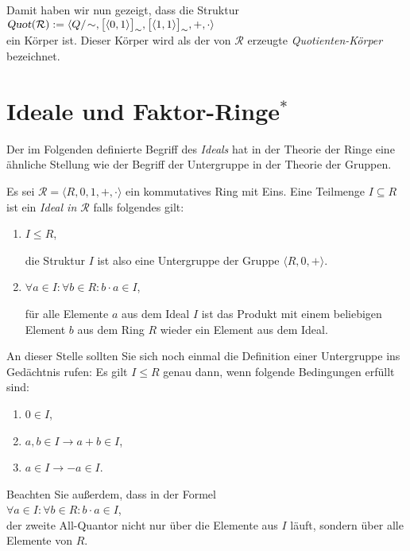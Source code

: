 Damit haben wir nun gezeigt, dass die Struktur
\\[0.2cm]
\hspace*{1.3cm}
$\textsl{Quot}(\mathcal{R}) := \langle Q/\!\sim, \bpr(0,1), \bpr(1,1), +, \cdot \rangle$ 
\\[0.2cm]
ein Körper ist.  Dieser Körper wird als der von $\mathcal{R}$ erzeugte \emph{Quotienten-Körper} bezeichnet.


\section{Ideale und Faktor-Ringe$^*$}
Der im Folgenden definierte Begriff des \emph{Ideals} hat in der Theorie der Ringe eine ähnliche
Stellung wie der Begriff der Untergruppe in der Theorie der Gruppen.
\begin{Definition}[Ideal]
Es sei $\mathcal{R} = \langle R, 0, 1, +, \cdot \rangle$ ein kommutatives Ring mit Eins.
Eine Teilmenge $I \subseteq R$ ist ein \emph{Ideal in $\mathcal{R}$} falls folgendes gilt:
\begin{enumerate}
\item $I \leq R$,

      die Struktur $I$ ist also eine Untergruppe der Gruppe $\langle R, 0, + \rangle$.
\item $\forall a \in I: \forall b \in R: b \cdot a \in I$,

      für alle Elemente $a$ aus dem Ideal $I$ ist das Produkt mit einem beliebigen Element
      $b$ aus dem Ring $R$ wieder ein Element aus dem Ideal. \eox
\end{enumerate}
\end{Definition}

\remark
An dieser Stelle sollten Sie sich noch einmal die Definition einer Untergruppe ins
Gedächtnis rufen:  Es gilt $I \leq R$ genau
dann, wenn folgende Bedingungen erfüllt sind:
\begin{enumerate}
\item $0 \in I$,
\item $a,b \in I \rightarrow a + b \in I$,
\item $a \in I \rightarrow -a \in I$.
\end{enumerate}
Beachten Sie außerdem, dass in der Formel 
\\[0.2cm]
\hspace*{1.3cm}
$\forall a \in I: \forall b \in R: b \cdot a \in I$,
\\[0.2cm]
der zweite All-Quantor nicht nur über die Elemente aus $I$ läuft, sondern über alle Elemente
von $R$.  \eox

